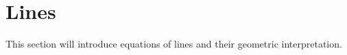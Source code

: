 \section{Lines}

This section will introduce equations of lines and their geometric interpretation.
